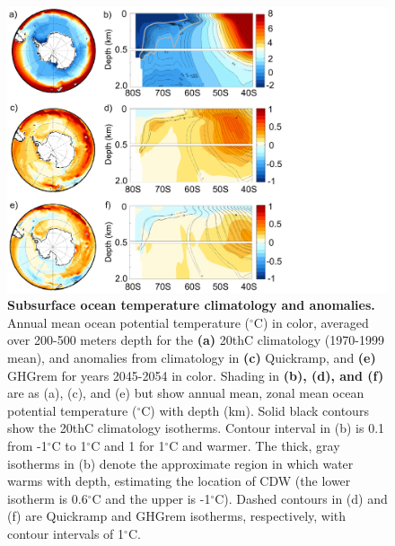 \documentclass[grl]{AGUTeX}  %
\begin{document}
\begin{article}
\begin{figure}[htbp] %
\centering
 \noindent\includegraphics[width=39pc]{figures/SHsubsfcTEMP_wclimo2.pdf}
\caption{\textbf{Subsurface ocean temperature climatology and anomalies.} Annual mean ocean potential temperature ($^\circ$C) in color, averaged over 200-500 meters depth for the \textbf{(a)} 20thC climatology (1970-1999 mean), and anomalies from climatology in \textbf{(c)} Quickramp, and \textbf{(e)} GHGrem for years 2045-2054 in color. Shading in \textbf{(b), (d), and (f)} are as (a), (c), and (e) but show annual mean, zonal mean ocean potential temperature ($^\circ$C) with depth (km). Solid black contours show the 20thC climatology isotherms. Contour interval in (b) is 0.1 from -1$^\circ$C to 1$^\circ$C and 1 for 1$^\circ$C and warmer. The thick, gray isotherms in (b) denote the approximate region in which water warms with depth, estimating the location of CDW (the lower isotherm is 0.6$^\circ$C and the upper is -1$^\circ$C). Dashed contours in (d) and (f) are Quickramp and GHGrem isotherms, respectively, with contour intervals of 1$^\circ$C.
} 
\label{fig:shsubtemp}
\end{figure}


\end{article}
\end{document}
